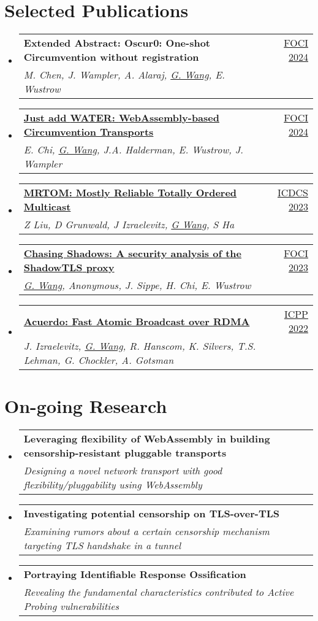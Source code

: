 \documentclass[letterpaper,11pt]{article}
\makeatletter
\newcommand{\resumeSubheading}[4]{
  \vspace{-2pt}\item
    \begin{tabular*}{0.97\textwidth}[t]{l@{\extracolsep{\fill}}r}
      \textbf{#1} & #2 \\
      \textit{\small#3} & \textit{\small #4} \\
    \end{tabular*}\vspace{-7pt}
}
\newcommand{\resumeSubHeadingListStart}{\begin{itemize}[leftmargin=0.15in, label={}]}
\newcommand{\resumeSubHeadingListEnd}{\end{itemize}}
\makeatother
\begin{document}
\section{Selected Publications}
\resumeSubHeadingListStart
  \resumeSubheading
  {\textbf{Extended Abstract: Oscur0: One-shot Circumvention without registration}}{\href{https://foci.community/foci24.html}{FOCI 2024}}
  {M. Chen, J. Wampler, A. Alaraj, \underline{G. Wang}, E. Wustrow}{}
  \resumeSubheading
  {\href{https://arxiv.org/abs/2312.00163}{\textbf{Just add {WATER}: {WebAssembly}-based Circumvention Transports}}}{\href{https://foci.community/foci24.html}{FOCI 2024}}
  {E. Chi, \underline{G. Wang}, J.A. Halderman, E. Wustrow, J. Wampler}{}
  \resumeSubheading
  {\href{https://ieeexplore.ieee.org/document/10272412}{\textbf{{MRTOM}: Mostly Reliable Totally Ordered Multicast}}}{\href{https://icdcs2023.icdcs.org/}{ICDCS 2023}}
  {Z Liu, D Grunwald, J Izraelevitz, \underline{G Wang}, S Ha}{}
  \resumeSubheading
  {\href{https://www.petsymposium.org/foci/2023/foci-2023-0002.php}{\textbf{{Chasing Shadows}: A security analysis of the {ShadowTLS} proxy}}}{\href{https://foci.community/foci23.html}{FOCI 2023}}
  {\underline{G. Wang}, Anonymous, J. Sippe, H. Chi, E. Wustrow}{}
  \resumeSubheading
  {\href{https://dl.acm.org/doi/abs/10.1145/3545008.3545041}{\textbf{Acuerdo: Fast Atomic Broadcast over {RDMA}}}}{\href{https://icpp22.gitlabpages.inria.fr/}{ICPP 2022}}
  {J. Izraelevitz, \underline{G. Wang}, R. Hanscom, K. Silvers, T.S. Lehman, G. Chockler, A. Gotsman}{}
\resumeSubHeadingListEnd
\vspace{1pt}

\section{On-going Research}
\resumeSubHeadingListStart
  \resumeSubheading
  {\textbf{Leveraging flexibility of {WebAssembly} in building censorship-resistant pluggable transports}}{}
  {Designing a novel network transport with good flexibility/pluggability using WebAssembly}{}
  \resumeSubheading
  {\textbf{Investigating potential censorship on TLS-over-TLS}}{}
  {Examining rumors about a certain censorship mechanism targeting TLS handshake in a tunnel}{}
  \resumeSubheading
  {\textbf{Portraying Identifiable Response Ossification}}{}
  {Revealing the fundamental characteristics contributed to Active Probing vulnerabilities}{}
\resumeSubHeadingListEnd
\vspace{1pt}
\end{document}
